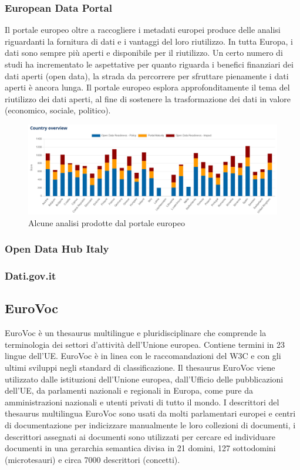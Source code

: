 \documentclass{article}
\theoremstyle{plain}
\theoremstyle{definition}
\begin{document}
\subsubsection{European Data Portal}
Il portale europeo oltre a raccogliere i metadati europei produce delle analisi riguardanti la fornitura di dati e i vantaggi del loro riutilizzo. In tutta Europa, i dati sono sempre più aperti e disponibile per il riutilizzo. Un certo numero di studi ha incrementato le aspettative per quanto riguarda i benefici finanziari dei dati aperti (open data), la strada da percorrere per sfruttare pienamente i dati aperti è ancora lunga. Il portale europeo esplora approfonditamente il tema del riutilizzo dei dati aperti, al fine di sostenere la trasformazione dei dati in valore (economico, sociale, politico). 

\begin{figure}[htbp]
\begin{center}
\includegraphics[scale=0.50]{img/eustat.png}
\caption{Alcune analisi prodotte dal portale europeo}
\end{center}
\end{figure}

\subsubsection{Open Data Hub Italy}
\subsubsection{Dati.gov.it}


\subsection{EuroVoc}
EuroVoc è un thesaurus multilingue e pluridisciplinare che comprende la terminologia dei settori d'attività dell'Unione europea. Contiene termini in 23 lingue dell'UE. EuroVoc è in linea con le raccomandazioni del W3C e con gli ultimi sviluppi negli standard di classificazione. Il thesaurus EuroVoc viene utilizzato dalle istituzioni dell'Unione europea, dall'Ufficio delle pubblicazioni dell'UE, da parlamenti nazionali e regionali in Europa, come pure da amministrazioni nazionali e utenti privati di tutto il mondo.
\footnotemark
{}
I descrittori del thesaurus multilingua EuroVoc sono usati da molti parlamentari europei e centri di documentazione per indicizzare manualmente le loro collezioni di documenti, i descrittori assegnati ai documenti sono utilizzati per cercare ed individuare documenti in una gerarchia semantica divisa in 21 domini, 127 sottodomini (microtesauri) e circa 7000 descrittori (concetti).
\end{document}
